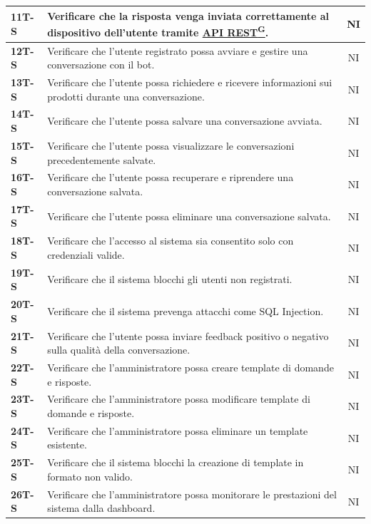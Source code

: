 \documentclass{article}
\begin{document}
\begin{longtable}{|>{\centering\arraybackslash}m{}|>{\raggedright\arraybackslash}m{}|c|}
    \hline
    \textbf{11T-S} & Verificare che la risposta venga inviata correttamente al dispositivo dell’utente tramite \href{https://code7crusaders.github.io/docs/PB/documentazione_interna/glossario.html#api-rest-representational-state-transfer}{API REST\textsuperscript{G}}. & NI \\
    \hline
    \textbf{12T-S} & Verificare che l’utente registrato possa avviare e gestire una conversazione con il bot. & NI \\
    \hline
    \textbf{13T-S} & Verificare che l’utente possa richiedere e ricevere informazioni sui prodotti durante una conversazione. & NI \\
    \hline
    \textbf{14T-S} & Verificare che l’utente possa salvare una conversazione avviata. & NI \\
    \hline
    \textbf{15T-S} & Verificare che l’utente possa visualizzare le conversazioni precedentemente salvate. & NI \\
    \hline
    \textbf{16T-S} & Verificare che l’utente possa recuperare e riprendere una conversazione salvata. & NI \\
    \hline
    \textbf{17T-S} & Verificare che l’utente possa eliminare una conversazione salvata. & NI \\
    \hline
    \textbf{18T-S} & Verificare che l’accesso al sistema sia consentito solo con credenziali valide. & NI \\
    \hline
    \textbf{19T-S} & Verificare che il sistema blocchi gli utenti non registrati. & NI \\
    \hline
    \textbf{20T-S} & Verificare che il sistema prevenga attacchi come SQL Injection. & NI \\
    \hline
    \textbf{21T-S} & Verificare che l’utente possa inviare feedback positivo o negativo sulla qualità della conversazione. & NI \\
    \hline
    \textbf{22T-S} & Verificare che l’amministratore possa creare template di domande e risposte. & NI \\
    \hline
    \textbf{23T-S} & Verificare che l’amministratore possa modificare template di domande e risposte. & NI \\
    \hline
    \textbf{24T-S} & Verificare che l’amministratore possa eliminare un template esistente. & NI \\
    \hline
    \textbf{25T-S} & Verificare che il sistema blocchi la creazione di template in formato non valido. & NI \\
    \hline
    \textbf{26T-S} & Verificare che l’amministratore possa monitorare le prestazioni del sistema dalla dashboard. & NI \\

\end{longtable}
\end{document}
